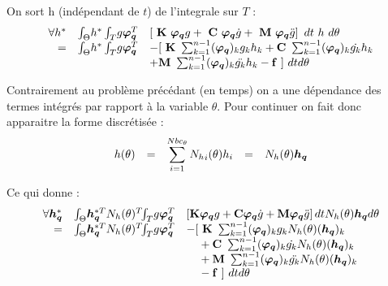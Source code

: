 \documentclass[12pt,a4paper]{report}
\begin{document}
On sort h (indépendant de $t$) de l'integrale sur $T$ :  
\begin{equation}
\begin{array}{r r l}
	\forall h^*
	&\int_\Theta \!  h^* \int_T \! g \boldsymbol{\varphi_q}^T &
						\left[  ~\mathbf{K}~ \boldsymbol{\varphi_q}g
							+ ~\mathbf{C}~ \boldsymbol{\varphi_q} \dot{g}
							+ ~\mathbf{M}~ \boldsymbol{\varphi_q} \ddot{g}
						\right]~dt ~ h ~d\theta
	\\ = &\int_\Theta \!  h^* \int_T \! g \boldsymbol{\varphi_q}^T &
	  		-[~ \mathbf{K}~ \sum_{k=1}^{n-1} (\boldsymbol{\varphi_q})_k       g_k  h_k 
			+ \mathbf{C}~ \sum_{k=1}^{n-1} (\boldsymbol{\varphi_q})_k  \dot{g_k} h_k 
	\\ &&
			+ \mathbf{M}~ \sum_{k=1}^{n-1} (\boldsymbol{\varphi_q})_k \ddot{g_k} h_k
			-\mathbf{f}~] ~dt d\theta 
\end{array}
\end{equation}

Contrairement au problème précédant (en temps) on a une dépendance des termes intégrés par rapport à la variable $\theta$. Pour continuer on fait donc apparaitre la forme discrétisée :
\begin{equation}
	\begin{array}{l c l c l}
		h(\theta) &=& \displaystyle \sum_{i=1}^{Nbc_\theta}  {N_h}_i (\theta) h_i &=& N_h(\theta) \boldsymbol{h_q} \\
	\end{array}
\end{equation}

Ce qui donne :
\begin{equation}
\begin{array}{r r l}
	\forall \boldsymbol{h_q}^*
	&\int_\Theta \!  \boldsymbol{h_q}^{*T} N_h(\theta)^{T}  \!\! \int_T \! g \boldsymbol{\varphi_q}^T &
						\left[  \mathbf{K} \boldsymbol{\varphi_q}g
							+ \mathbf{C} \boldsymbol{\varphi_q} \dot{g}
							+ \mathbf{M} \boldsymbol{\varphi_q} \ddot{g}
						\right] dt  N_h(\theta) \boldsymbol{h_q} d\theta
	\\ = &\int_\Theta \!  \boldsymbol{h_q}^{*T} N_h(\theta)^{T}  \!\! \int_T \! g \boldsymbol{\varphi_q}^T &
	  		-[~ \mathbf{K}~ \sum_{k=1}^{n-1} (\boldsymbol{\varphi_q})_k       g_k N_h(\theta) (\boldsymbol{h_q})_k 
	  \\&& \phantom{-[}
			+ \mathbf{C}~ \sum_{k=1}^{n-1} (\boldsymbol{\varphi_q})_k  \dot{g_k} N_h(\theta) (\boldsymbol{h_q})_k 
	  \\&& \phantom{-[}
			+ \mathbf{M}~ \sum_{k=1}^{n-1} (\boldsymbol{\varphi_q})_k \ddot{g_k} N_h(\theta) (\boldsymbol{h_q})_k
	  \\&& \phantom{-[}
			-\mathbf{f}~] ~dt d\theta 
\end{array}
\end{equation}
\end{document}
